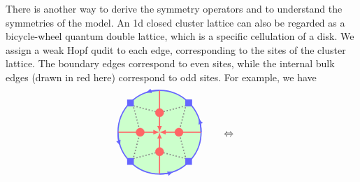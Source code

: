\documentclass[a4paper,11pt]{article}
\theoremstyle{theorem}
\theoremstyle{remark}
\begin{document}
There is another way to derive the symmetry operators and to understand the symmetries of the model.
An 1d closed cluster lattice can also be regarded as a bicycle-wheel quantum double lattice, which is a specific cellulation of a disk. We assign a weak Hopf qudit to each edge, corresponding to the sites of the cluster lattice. The boundary edges correspond to even sites, while the internal bulk edges (drawn in red here) correspond to odd sites. For example, we have
\begin{equation}
\begin{aligned}
		\begin{tikzpicture}
               \filldraw[color=blue!60, fill=green!20, very thick](0,0) circle (1.5);
                \draw[dotted,gray,very thick] (0.95,0.95) -- (0,0.7) -- (-0.95,0.95)-- (-0.7,0) --(-0.95,-0.95)--(0,-0.7)--(0.95,-0.95)--(0.7,0)--(0.95,0.95);
			\draw[latex-,red!60,very thick] (0,0) -- (0,-1.5); %
			\draw[latex-,red!60,very thick] (0,0) -- (0,1.5);  %
   			\draw[latex-,red!60,very thick] (0,0) -- (1.5,0);  %
         	\draw[latex-,red!60,very thick] (0,0) -- (-1.5,0); %
                \draw[blue!60, very thick, -latex] (1.5,0) arc (0:20:1.5);
                \draw[blue!60, very thick, -latex] (0,1.5) arc (90:110:1.5);
                \draw[blue!60, very thick, -latex] (-1.5,0) arc (180:200:1.5);
                \draw[blue!60, very thick, -latex] (0,-1.5) arc (270:290:1.5);
                \draw[blue!60, fill=blue!60,very thick] (0.95,0.95) rectangle ++(0.2,.2);
                \draw[blue!60, fill=blue!60,very thick] (0.95,0.95) rectangle ++(0.2,.2);
                \draw[blue!60, fill=blue!60,very thick] (-0.95,0.95) rectangle ++(-0.2,.2);
                \draw[blue!60, fill=blue!60,very thick] (-0.95,-0.95) rectangle ++(-0.2,-.2);
                \draw[blue!60, fill=blue!60,very thick] (0.95,-0.95) rectangle ++(0.2,-.2);
			\draw [fill = red!60,red!60] (0.7,0) circle (0.15);
               \draw [fill = red!60,red!60] (-0.7,0) circle (0.15);
               \draw [fill = red!60,red!60] (0,0.7) circle (0.15);
               \draw [fill = red!60,red!60] (0,-0.7) circle (0.15);
		\end{tikzpicture}
	\end{aligned} \quad \quad  \Leftrightarrow \quad 
     \begin{aligned}

\end{aligned}
\end{equation}
\end{document}
